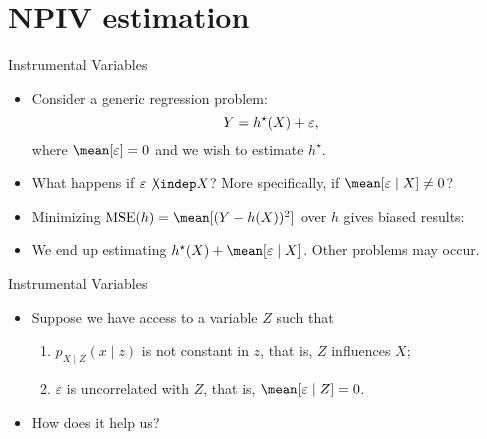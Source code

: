 \documentclass[aspectratio=169]{beamer}
\begin{document}
    \frame{\titlepage}

    \section{NPIV estimation}

    \begin{frame}{Instrumental Variables}
        \begin{itemize}
            \item<1-> Consider a generic regression problem:
                \begin{equation*}
                    Y = h^{ \star } ( X ) + \varepsilon
                ,\end{equation*}
                where $ \mean [ \varepsilon ] = 0 $ and we wish to estimate $ h^{ \star } $.

                \item<2-> What happens if $ \varepsilon \not\kern-1pt\indep X $? More specifically, if $ \mean [ \varepsilon \mid X ] \neq 0 $?
                \item<3-> Minimizing $ \mse ( h ) = \mean [ ( Y - h ( X ) )^2 ] $ over $ h $ gives biased results:
                \item<5-> We end up estimating $ \hstar ( X ) + \mean [ \varepsilon \mid X ] $.
                    Other problems may occur.
        \end{itemize}
    \end{frame}

    \begin{frame}{Instrumental Variables}
        \begin{itemize}
            \item<1-> Suppose we have access to a variable $ Z $ such that
                \begin{enumerate}
                    \item<2-> $ p_{ X\mid Z } ( x \mid z ) $ is not constant in $ z $, that is, $ Z $ influences $ X $;
                    \item<3-> $ \varepsilon $ is uncorrelated with $ Z $, that is, $ \mean [ \varepsilon \mid Z ] = 0 $.
                \end{enumerate}
                \item<6-> How does it help us?
        \end{itemize}
    \end{frame}
\end{document}

